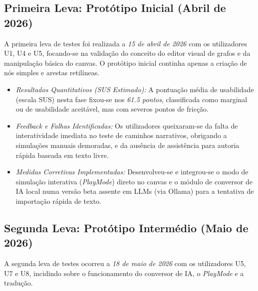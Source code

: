 \subsection{Primeira Leva: Protótipo Inicial (Abril de 2026)}
A primeira leva de testes foi realizada a \textit{15 de abril de 2026} com os utilizadores U1, U4 e U5, focando-se na validação do conceito do editor visual de grafos e da manipulação básica do canvas. O protótipo inicial continha apenas a criação de nós simples e arestas retilíneas.

\begin{itemize}
    \item \textit{Resultados Quantitativos (SUS Estimado):} A pontuação média de usabilidade (escala SUS) nesta fase fixou-se nos \textit{61.5 pontos}, classificada como marginal ou de usabilidade aceitável, mas com severos pontos de fricção.
    \item \textit{Feedback e Falhas Identificadas:} Os utilizadores queixaram-se da falta de interatividade imediata no teste de caminhos narrativos, obrigando a simulações manuais demoradas, e da ausência de assistência para autoria rápida baseada em texto livre.
    \item \textit{Medidas Corretivas Implementadas:} Desenvolveu-se e integrou-se o modo de simulação interativa (\textit{PlayMode}) direto no canvas e o módulo de conversor de IA local numa versão beta assente em LLMs (via Ollama) para a tentativa de importação rápida de texto.
\end{itemize}

\subsection{Segunda Leva: Protótipo Intermédio (Maio de 2026)}
A segunda leva de testes ocorreu a \textit{18 de maio de 2026} com os utilizadores U5, U7 e U8, incidindo sobre o funcionamento do conversor de IA, o \textit{PlayMode} e a tradução.

